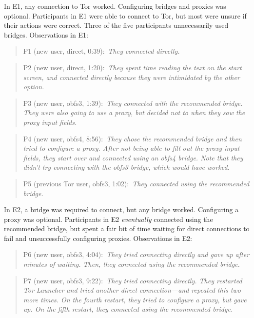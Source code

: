 \documentclass[USenglish,oneside,twocolumn]{article}
\newcommand{\pquote}[2]{
\begin{quotation}
\noindent #1:~\textit{#2}
\end{quotation}
}
\begin{document}


In E1, any connection to Tor worked. Configuring bridges and proxies was optional.  
Participants in E1 were able to connect to Tor, but most were unsure if their actions were correct. Three of the five participants unnecessarily used bridges. 
Observations in E1: 

\pquote{P1 (new user, direct, 0:39)}{They connected directly.}

\pquote{P2 (new user, direct, 1:20)}{They spent time reading the text on the start screen, and connected directly because they were intimidated by the other option.}

\pquote{P3 (new user, obfs3, 1:39)}{They connected with the recommended bridge. They were also going to use a proxy, but decided not to when they saw the proxy input fields.}

\pquote{P4 (new user, obfs4, 8:56)}{They chose the recommended bridge and then tried to configure a proxy. After not being able to fill out the proxy input fields, they start over and connected using an obfs4 bridge. Note that they didn't try connecting with the obfs3 bridge, which would have worked.}

\pquote{P5 (previous Tor user, obfs3, 1:02)}{They connected using the recommended bridge.}

In E2, a bridge was required to connect, but any bridge worked. Configuring a proxy was optional.
Participants in E2 {\it eventually} connected using the recommended bridge, but spent a fair bit of time waiting for direct connections to fail and unsuccessfully configuring proxies. 
Observations in E2: 

\pquote{P6 (new user, obfs3, 4:04)}{They tried connecting directly and gave up after minutes of waiting. Then, they connected using the recommended bridge.}

\pquote{P7 (new user, obfs3, 9:22)}{They tried connecting directly. They restarted Tor Launcher and tried another direct connection---and repeated this two more times. On the fourth restart, they tried to configure a proxy, but gave up. On the fifth restart, they connected using the recommended bridge.}
\end{document}
